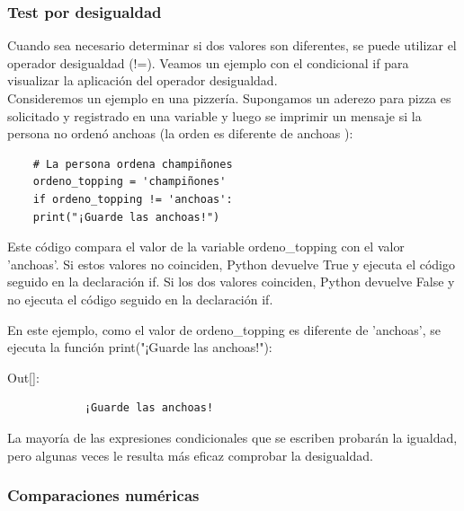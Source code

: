 \subsubsection{Test por desigualdad}

Cuando sea necesario determinar si dos valores son diferentes, se puede utilizar el operador desigualdad ({\ttfamily !=}). Veamos un ejemplo con el condicional {\ttfamily if} para visualizar la aplicación del operador desigualdad. \\

Consideremos un ejemplo en una pizzería. Supongamos un aderezo para pizza es solicitado  y registrado en una variable y luego se imprimir un mensaje si la persona no ordenó anchoas (la orden es diferente de anchoas ):

\hspace{-2.5cm}{\ttfamily \scriptsize toppings.py}  \vspace{-0.5cm}
\begin{lstlisting}	
	# La persona ordena champiñones	
	ordeno_topping = 'champiñones'
	if ordeno_topping != 'anchoas':
	print("¡Guarde las anchoas!")
\end{lstlisting}

Este código compara el valor de la variable {\ttfamily ordeno\_topping} con el valor {\ttfamily 'anchoas'}.
Si estos  valores no coinciden, Python devuelve {\ttfamily True} y ejecuta el código 
seguido en la declaración {\ttfamily if}. Si los dos valores coinciden, Python devuelve {\ttfamily False} y
no ejecuta el código seguido en la declaración {\ttfamily if}. 

En este ejemplo, como el valor de {\ttfamily ordeno\_topping} es diferente de {\ttfamily 'anchoas'}, se ejecuta la función {\ttfamily  print("¡Guarde las anchoas!")}:\vspace{0.08cm}

{\ttfamily\scriptsize\scriptsize \noindent Out[]:\vspace{-0.3cm}	
	{\color{blue} 	
		\begin{verbatim}
			¡Guarde las anchoas!			
		\end{verbatim}
}}


La mayoría de las expresiones condicionales que se escriben probarán la igualdad, pero 
algunas  veces le resulta más eficaz comprobar la desigualdad.

\subsubsection{Comparaciones numéricas}

